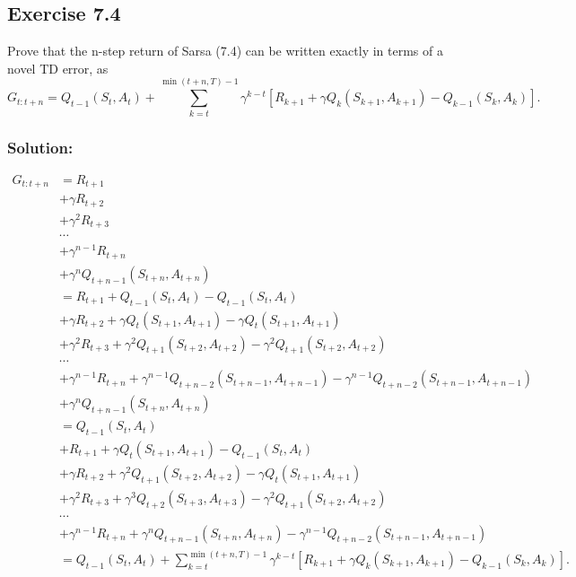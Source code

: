 \subsection*{Exercise 7.4}
Prove that the n-step return of Sarsa (7.4) can be written exactly in terms
of a novel TD error, as
\[
G_{t:t+n} = Q_{t-1}(S_t, A_t) + \sum_{k=t}^{\min(t+n, T) - 1} \gamma^{k-t} \left[ R_{k+1} + \gamma Q_k(S_{k+1}, A_{k+1}) - Q_{k-1}(S_k, A_k) \right].
\]

\subsubsection*{Solution:}

\begin{align*}
    G_{t:t+n} &= R_{t+1} \\
    &+ \gamma R_{t+2} \\
    &+ \gamma^2 R_{t+3} \\
    &\cdots \\
    &+ \gamma^{n-1} R_{t+n} \\
    &+ \gamma^n Q_{t+n-1}(S_{t+n}, A_{t+n})  \\
    &= R_{t+1} + Q_{t-1}(S_{t}, A_{t}) - Q_{t-1}(S_{t}, A_{t}) \\
    &+ \gamma R_{t+2} + \gamma  Q_{t}(S_{t+1}, A_{t+1}) -\gamma  Q_{t}(S_{t+1}, A_{t+1})\\
    &+ \gamma^2 R_{t+3} + \gamma^2 Q_{t+1}(S_{t+2}, A_{t+2}) -\gamma^2  Q_{t+1}(S_{t+2}, A_{t+2}) \\
    &\cdots \\
    &+ \gamma^{n-1} R_{t+n} + \gamma^{n-1}Q_{t+n-2}(S_{t+n-1}, A_{t+n-1}) - \gamma^{n-1}Q_{t+n-2}(S_{t+n-1}, A_{t+n-1}) \\
    &+ \gamma^n Q_{t+n-1}(S_{t+n}, A_{t+n}) \\
    &= Q_{t-1}(S_t, A_t) \\
    &+ R_{t+1} + \gamma Q_t(S_{t+1}, A_{t+1}) - Q_{t-1}(S_t, A_t) \\
    &+ \gamma R_{t+2} + \gamma^2 Q_{t+1}(S_{t+2}, A_{t+2}) - \gamma Q_t(S_{t+1}, A_{t+1}) \\
    &+ \gamma^2 R_{t+3} + \gamma^3 Q_{t+2}(S_{t+3}, A_{t+3}) - \gamma^2 Q_{t+1}(S_{t+2}, A_{t+2}) \\
    &\cdots \\
    &+ \gamma^{n-1} R_{t+n} + \gamma^n Q_{t+n-1}(S_{t+n}, A_{t+n}) - \gamma^{n-1} Q_{t+n-2}(S_{t+n-1}, A_{t+n-1}) \\
    &= Q_{t-1}(S_t, A_t) + \sum_{k=t}^{\min(t+n, T) - 1} \gamma^{k-t} \left[ R_{k+1} + \gamma Q_k(S_{k+1}, A_{k+1}) - Q_{k-1}(S_k, A_k) \right].
\end{align*}


